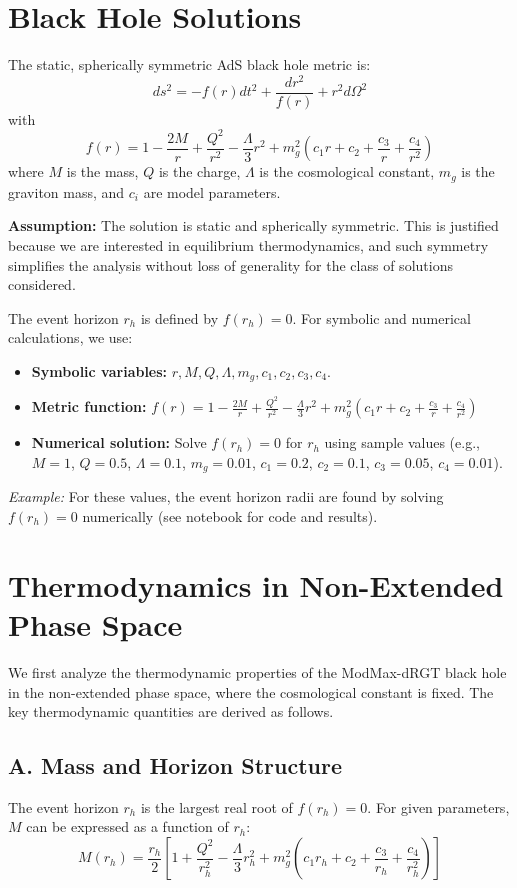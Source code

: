 \documentclass[12pt]{article}
\begin{document}
\section{Black Hole Solutions}
The static, spherically symmetric AdS black hole metric is:
\begin{equation}
ds^2 = -f(r) dt^2 + \frac{dr^2}{f(r)} + r^2 d\Omega^2
\end{equation}
with
\begin{equation}
f(r) = 1 - \frac{2M}{r} + \frac{Q^2}{r^2} - \frac{\Lambda}{3} r^2 + m_g^2 (c_1 r + c_2 + \frac{c_3}{r} + \frac{c_4}{r^2})
\end{equation}
where $M$ is the mass, $Q$ is the charge, $\Lambda$ is the cosmological constant, $m_g$ is the graviton mass, and $c_i$ are model parameters.

\textbf{Assumption:} The solution is static and spherically symmetric. This is justified because we are interested in equilibrium thermodynamics, and such symmetry simplifies the analysis without loss of generality for the class of solutions considered.

The event horizon $r_h$ is defined by $f(r_h) = 0$.
For symbolic and numerical calculations, we use:
\begin{itemize}
    \item \textbf{Symbolic variables:} $r, M, Q, \Lambda, m_g, c_1, c_2, c_3, c_4$.
    \item \textbf{Metric function:} $f(r) = 1 - \frac{2M}{r} + \frac{Q^2}{r^2} - \frac{\Lambda}{3} r^2 + m_g^2 (c_1 r + c_2 + \frac{c_3}{r} + \frac{c_4}{r^2})$
    \item \textbf{Numerical solution:} Solve $f(r_h) = 0$ for $r_h$ using sample values (e.g., $M=1$, $Q=0.5$, $\Lambda=0.1$, $m_g=0.01$, $c_1=0.2$, $c_2=0.1$, $c_3=0.05$, $c_4=0.01$).
\end{itemize}
\textit{Example:} For these values, the event horizon radii are found by solving $f(r_h) = 0$ numerically (see notebook for code and results).

\section{Thermodynamics in Non-Extended Phase Space}
We first analyze the thermodynamic properties of the ModMax-dRGT black hole in the non-extended phase space, where the cosmological constant is fixed. The key thermodynamic quantities are derived as follows.

\subsection*{A. Mass and Horizon Structure}
The event horizon $r_h$ is the largest real root of $f(r_h) = 0$. For given parameters, $M$ can be expressed as a function of $r_h$:
\begin{equation}
M(r_h) = \frac{r_h}{2} \left[ 1 + \frac{Q^2}{r_h^2} - \frac{\Lambda}{3} r_h^2 + m_g^2 (c_1 r_h + c_2 + \frac{c_3}{r_h} + \frac{c_4}{r_h^2}) \right]
\end{equation}
\end{document}
